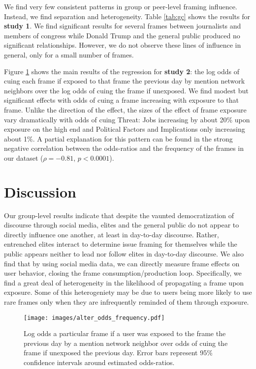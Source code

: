 \documentclass[a4paper,12pt]{article}
\begin{document}
    We find very few consistent patterns in group or peer-level framing influence. Instead, we find separation and heterogeneity. Table \ref{tab:gc} shows the results for \textbf{study 1}. We find significant results for several frames between journalists and members of congress while Donald Trump and the general public produced no significant relationships. However, we do not observe these lines of influence in general, only for a small number of frames.

    Figure \ref{fig:image} shows the main results of the regression for \textbf{study 2}: the log odds of cuing each frame if exposed to that frame the previous day by mention network neighbors over the log odds of cuing the frame if unexposed. We find modest but significant effects with odds of cuing a frame increasing with exposure to that frame. Unlike the direction of the effect, the sizes of the effect of frame exposure vary dramatically with odds of cuing Threat: Jobs increasing by about 20\% upon exposure on the high end and Political Factors and Implications only increasing about 1\%. A partial explanation for this pattern can be found in the strong negative correlation between the odds-ratios and the frequency of the frames in our dataset ($\rho=-0.81$, $p < 0.0001$).


\section*{Discussion}

Our group-level results indicate that despite the vaunted democratization of discourse through social media, elites and the general public do not appear to directly influence one another, at least in day-to-day discourse. Rather, entrenched elites interact to determine issue framing for themselves while the public appears neither to lead nor follow elites in day-to-day discourse. We also find that by using social media data, we can directly measure frame effects on user behavior, closing the frame consumption/production loop. Specifically, we find a great deal of heterogeneity in the likelihood of propagating a frame upon exposure. Some of this heterogeniety may be due to users being more likely to use rare frames only when they are infrequently reminded of them through exposure.


%
\printbibliography


\newpage

\begin{figure}[htp]
\centering
\texttt{[image: images/alter\_odds\_frequency.pdf]}
\caption{Log odds a particular frame if a user was exposed to the frame the previous day by a mention network neighbor over odds of cuing the frame if unexposed the previous day. Error bars represent 95\% confidence intervals around estimated odds-ratios.}
\label{fig:image}
\end{figure}
\end{document}
